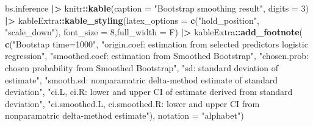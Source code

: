 \documentclass[
]{article}
\newenvironment{Shaded}{\begin{snugshade}}{\end{snugshade}}
\newcommand{\AttributeTok}[1]{\textcolor[rgb]{0.13,0.29,0.53}{#1}}
\newcommand{\DecValTok}[1]{\textcolor[rgb]{0.00,0.00,0.81}{#1}}
\newcommand{\FunctionTok}[1]{\textcolor[rgb]{0.13,0.29,0.53}{\textbf{#1}}}
\newcommand{\NormalTok}[1]{#1}
\newcommand{\SpecialCharTok}[1]{\textcolor[rgb]{0.81,0.36,0.00}{\textbf{#1}}}
\newcommand{\StringTok}[1]{\textcolor[rgb]{0.31,0.60,0.02}{#1}}
\begin{document}
\begin{Shaded}
\begin{Highlighting}[]
\NormalTok{bs.inference }\SpecialCharTok{|\textgreater{}}\NormalTok{ knitr}\SpecialCharTok{::}\FunctionTok{kable}\NormalTok{(}\AttributeTok{caption =} \StringTok{"Bootstrap smoothing result"}\NormalTok{, }\AttributeTok{digits =} \DecValTok{3}\NormalTok{) }\SpecialCharTok{|\textgreater{}} 
\NormalTok{    kableExtra}\SpecialCharTok{::}\FunctionTok{kable\_styling}\NormalTok{(}\AttributeTok{latex\_options =} \FunctionTok{c}\NormalTok{(}\StringTok{"hold\_position"}\NormalTok{, }\StringTok{"scale\_down"}\NormalTok{),}
                              \AttributeTok{font\_size =} \DecValTok{8}\NormalTok{,}\AttributeTok{full\_width =}\NormalTok{ F) }\SpecialCharTok{|\textgreater{}} 
\NormalTok{    kableExtra}\SpecialCharTok{::}\FunctionTok{add\_footnote}\NormalTok{(}
        \FunctionTok{c}\NormalTok{(}\StringTok{"Bootstap time=1000"}\NormalTok{, }
          \StringTok{"origin.coef: estimation from selected predictors logistic regression"}\NormalTok{, }
          \StringTok{"smoothed.coef: estimation from Smoothed Bootstrap"}\NormalTok{, }
          \StringTok{"chosen.prob: chosen probability from Smoothed Bootstrap"}\NormalTok{, }
          \StringTok{"sd: standard deviation of estimate"}\NormalTok{,}
          \StringTok{"smooth.sd: nonparamatric delta{-}method estimate of standard deviation"}\NormalTok{, }
          \StringTok{"ci.L, ci.R:  lower and upper CI of estimate derived from standard deviation"}\NormalTok{, }
          \StringTok{"ci.smoothed.L, ci.smoothed.R: lower and upper CI from nonparamatric delta{-}method estimate"}\NormalTok{),}
        \AttributeTok{notation =} \StringTok{"alphabet"}\NormalTok{)}
\end{Highlighting}
\end{Shaded}

\begingroup\fontsize{8}{10}\selectfont
\end{document}
